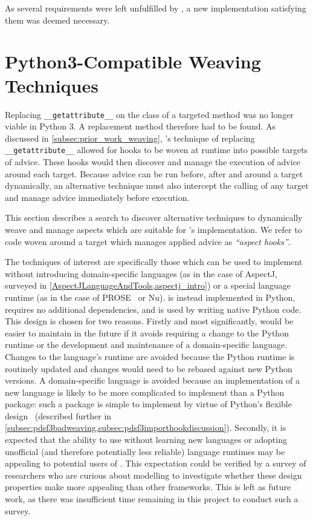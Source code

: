 As several requirements were left unfulfilled by
\pydysofu{}, a new implementation satisfying them was deemed necessary.


\section{Python3-Compatible Weaving Techniques}\label{sec:pdsf3python3}

Replacing \lstinline{__getattribute__} on the class of a targeted method was no
longer viable in Python 3. A replacement method therefore had to be found. As
discussed in \cref{subsec:prior_work_weaving}, \pydysofu{}'s technique of
replacing \lstinline{__getattribute__} allowed for hooks to be woven at runtime
into possible targets of advice. These hooks would then discover and manage the
execution of advice around each target. Because advice can be run before, after
and around a target dynamically, an alternative technique must also intercept
the calling of any target and manage advice immediately before execution. 

This section describes a search to discover alternative techniques to
dynamically weave and manage aspects which are suitable for \pdsfthree{}'s
implementation. We refer to code woven around a target which manages applied
advice as \emph{``aspect hooks''}.

The techniques of interest are specifically those which can be used to implement
\aop{} without introducing domain-specific languages (as in the case of AspectJ,
surveyed in \cref{AspectJLanguageAndTools,aspectj_intro}) or a special language
runtime (as in the case of PROSE~\cite{popovici2002PROSE} or
Nu\cite{rajan2006nu_towardsao_invocation}). \pdsfthree{} is instead implemented
in Python, requires no additional dependencies, and is used by writing native
Python code. This design is chosen for two reasons. Firstly and most
significantly, \pdsfthree would be easier to maintain in the future if it avoids
requiring a change to the Python runtime or the development and maintenance of a
domain-specific language. Changes to the language's runtime are avoided because
the Python runtime is routinely updated and changes would need to be rebased
against new Python versions. A domain-specific language is avoided because an
implementation of a new language is likely to be more complicated to implement
than a Python package: such a package is simple to implement by virtue of
Python's flexible
design~\cite{advanced_python_monkey_patching,forbiddenfruit_repo}
(described further in
\cref{subsec:pdsf3badweaving,subsec:pdsf3importhookdiscussion}). Secondly, it is
expected that the ability to use \pdsfthree{} without learning new languages or
adopting unofficial (and therefore potentially less reliable) language runtimes
may be appealing to potential users of \aop{}. This expectation could be
verified by a survey of researchers who are curious about \aspectoriented{}
modelling to investigate whether these design properties make \pdsfthree{} more
appealing than other \aop{} frameworks. This is left as future work, as there
was insufficient time remaining in this project to conduct such a survey.


